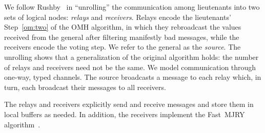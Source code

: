 \documentclass{llncs/llncs}
\newcommand{\OMH}{\ensuremath{\mathrm{OMH}}\xspace}
\begin{document}
We follow Rushby~\cite{Rushby:OM1} in ``unrolling'' the communication among lieutenants into two sets of logical nodes: \emph{relays} and \emph{receivers}. Relays encode the lieutenants' Step~\ref{om:two} of the \OMH algorithm, in which they rebroadcast the values received from the general after filtering manifestly bad messages, while the receivers encode the voting step. We refer to the general as the \emph{source}. The unrolling shows that a generalization of the original algorithm holds: the number of relays and receivers need not be the same. We model communication through one-way, typed channels. The source broadcasts a message to each relay which, in turn, each broadcast their messages to all receivers.

The relays and receivers explicitly send and receive messages and store them in local buffers as needed. In addition, the receivers implement the Fast~MJRY algorithm~\cite{mjrty}.
\end{document}
